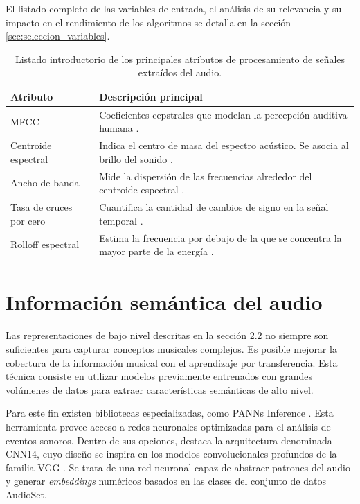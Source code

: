 El listado completo de las variables de entrada, el análisis de su relevancia y su impacto en el rendimiento de los algoritmos se detalla en la sección \ref{sec:seleccion_variables}.

\begin{table}[htpb]
    \centering
    \caption[Atributos representativos]{Listado introductorio de los principales atributos de procesamiento de señales extraídos del audio.}
    \renewcommand{\arraystretch}{1.2}
    \begin{tabular}{p{3.5cm} p{8.5cm}}    
        \toprule
        \textbf{Atributo} & \textbf{Descripción principal} \\
        \midrule
        MFCC & Coeficientes cepstrales que modelan la percepción auditiva humana \citep{muller2015fundamentals}. \\       
        Centroide espectral & Indica el centro de masa del espectro acústico. Se asocia al brillo del sonido \citep{lerch2012introduction}. \\
        Ancho de banda & Mide la dispersión de las frecuencias alrededor del centroide espectral \citep{lerch2012introduction}. \\
        Tasa de cruces por cero & Cuantifica la cantidad de cambios de signo en la señal temporal \citep{lerch2012introduction}. \\
        Rolloff espectral & Estima la frecuencia por debajo de la que se concentra la mayor parte de la energía \citep{lerch2012introduction}. \\
        \bottomrule
    \end{tabular}
    \label{tab:atributos_dsp}
\end{table}

\section{Información semántica del audio}
\label{sec:semantica}

Las representaciones de bajo nivel descritas en la sección 2.2 no siempre son suficientes para capturar conceptos musicales complejos. Es posible mejorar la cobertura de la información musical con el aprendizaje por transferencia. Esta técnica consiste en utilizar modelos previamente entrenados con grandes volúmenes de datos para extraer características semánticas de alto nivel.

Para este fin existen bibliotecas especializadas, como PANNs Inference \citep{kong2020panns}. Esta herramienta provee acceso a redes neuronales optimizadas para el análisis de eventos sonoros. Dentro de sus opciones, destaca la arquitectura denominada CNN14, cuyo diseño se inspira en los modelos convolucionales profundos de la familia VGG \citep{simonyan2014very}. Se trata de una red neuronal capaz de abstraer patrones del audio y generar \textit{embeddings} numéricos basados en las clases del conjunto de datos AudioSet.

